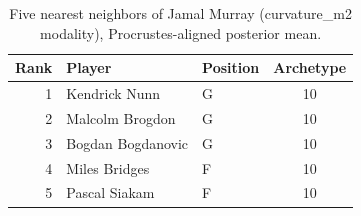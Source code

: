 \begin{table}[htbp]
  \centering\small
  \begin{tabular}{rllc}
    \toprule
    Rank & Player & Position & Archetype \\
    \midrule
    1 & Kendrick Nunn & G & 10 \\
    2 & Malcolm Brogdon & G & 10 \\
    3 & Bogdan Bogdanovic & G & 10 \\
    4 & Miles Bridges & F & 10 \\
    5 & Pascal Siakam & F & 10 \\
    \bottomrule
  \end{tabular}
  \caption{Five nearest neighbors of Jamal Murray (curvature_m2 modality), Procrustes-aligned posterior mean.}
  \label{tab:Jamal_Murray_neighbors_curvature_m2}
\end{table}

